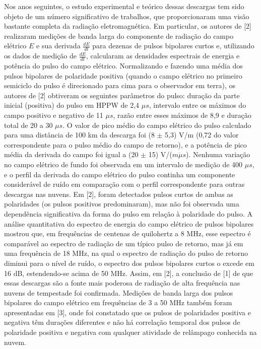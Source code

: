 \documentclass[a4paper, 12pt, onecolumn,singlespacing]{article}
\begin{document}
	Nos anos seguintes, o estudo experimental e teórico dessas descargas tem sido objeto de um número significativo de trabalhos, que proporcionaram uma visão bastante completa da radiação eletromagnética. Em particular, os autores de [2] realizaram medições de banda larga do componente de radiação do campo elétrico $E$ e sua derivada $\frac{dE}{dt}$ para dezenas de pulsos bipolares curtos e, utilizando os dados de medição de $\frac{dE}{dt}$, calcularam as densidades espectrais de energia e potência do pulso do campo elétrico. Normalizando e fazendo uma média dos pulsos bipolares de polaridade positiva (quando o campo elétrico no primeiro semiciclo do pulso é direcionado para cima para o observador em terra), os autores de [2] obtiveram os seguintes parâmetros do pulso: duração da parte inicial (positiva) do pulso em HPPW de 2,4 $\mu s$, intervalo entre os máximos do campo positivo e negativo de 11 $\mu s$, razão entre esses máximos de 8,9 e duração total de 20 a 30 $\mu s$. O valor de pico médio do campo elétrico do pulso calculado para uma distância de 100 km da descarga foi (8 $\pm$ 5,3) V/m (0,72 do valor correspondente para o pulso médio do campo de retorno), e a potência de pico média da derivada do campo foi igual a (20 $\pm$ 15) V/($m \dot \mu s$). Nenhuma variação no campo elétrico de fundo foi observada em um intervalo de medição de 400 $\mu s$, e o perfil da derivada do campo elétrico do pulso continha um componente considerável de ruído em comparação com o perfil correspondente para outras descargas nas nuvens. Em [2], foram detectados pulsos curtos de ambas as polaridades (os pulsos positivos predominaram), mas não foi observada uma dependência significativa da forma do pulso em relação à polaridade do pulso. A análise quantitativa do espectro de energia do campo elétrico de pulsos bipolares mostrou que, em frequências de centenas de quilohertz a 8 MHz, esse espectro é comparável ao espectro de radiação de um típico pulso de retorno, mas já em uma frequência de 18 MHz, na qual o espectro de radiação do pulso de retorno diminui para o nível de ruído, o espectro dos pulsos bipolares curtos o excede em 16 dB, estendendo-se acima de 50 MHz. Assim, em [2], a conclusão de [1] de que essas descargas são a fonte mais poderosa de radiação de alta frequência nas nuvens de tempestade foi confirmada. Medições de banda larga dos pulsos bipolares do campo elétrico em frequências de 3 a 50 MHz também foram apresentadas em [3], onde foi constatado que os pulsos de polaridades positiva e negativa têm durações diferentes e não há correlação temporal dos pulsos de polaridade positiva e negativa com qualquer atividade de relâmpago conhecida na nuvem.
	
	
\end{document}

